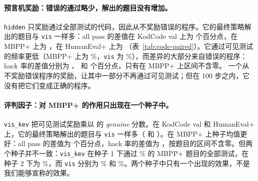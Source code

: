 \paragraph{预言机奖励：错误的通过略少，解出的题目没有增加。} \texttt{hidden} 只奖励通过全部测试的代码，因此从不奖励错误的程序。它的最终策略解出的题目与 \texttt{vis} 一样多：all pass 的差值在 KodCode val 上为   个百分点，在 MBPP+ 上为  ，在 HumanEval+ 上为  （表~\ref{tab:code-paired}）。它通过可见测试的频率更低（MBPP+ 上为 \%，\texttt{vis} 为 \%），而差异的大部分来自错误的程序：hack 率的差值分别为  、  和   个百分点，只有在 MBPP+ 上区间不含零。
一个从不奖励错误程序的奖励，让其中一部分不再通过可见测试；但在 100 步之内，它没有把它们变成正确的程序。

\begin{table}[t]
\centering\small

\caption{相对 \texttt{vis} 的配对差（百分点）：在每道题上取各条件的种子均值，求差后对题目取平均，并给出按题目重采样的 95\% 区间。}
\label{tab:code-paired}
\end{table}

\paragraph{评判因子：对 MBPP+ 的作用只出现在一个种子中。} \texttt{vis\_kev} 把可见测试奖励乘以 \kev{} 的 \emph{genuine} 分数。在 KodCode val 和 HumanEval+ 上，它的最终策略解出的题目与 \texttt{vis} 一样多（  和  ）。在 MBPP+ 上种子均值更好：all pass 的差值为   个百分点，hack 率的差值为  ，按题目的区间不含零。但两个种子并不一致：\texttt{vis\_kev} 在种子 1 下通过 \% 的 MBPP+ 题目的全部测试，在种子 2 下为 \%，而 \texttt{vis} 分别为 \% 和 \%。两个种子中只有一个出现的效果，不是我们能够宣称的效果。


